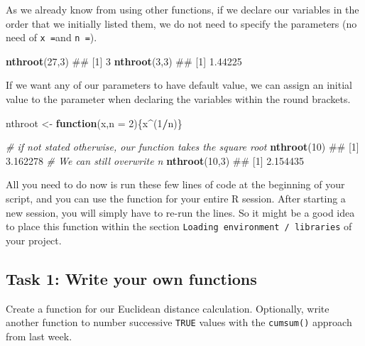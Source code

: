 \documentclass[]{book}
\newenvironment{Shaded}{\begin{snugshade}}{\end{snugshade}}
\newcommand{\KeywordTok}[1]{\textcolor[rgb]{0.13,0.29,0.53}{\textbf{#1}}}
\newcommand{\DataTypeTok}[1]{\textcolor[rgb]{0.13,0.29,0.53}{#1}}
\newcommand{\DecValTok}[1]{\textcolor[rgb]{0.00,0.00,0.81}{#1}}
\newcommand{\StringTok}[1]{\textcolor[rgb]{0.31,0.60,0.02}{#1}}
\newcommand{\CommentTok}[1]{\textcolor[rgb]{0.56,0.35,0.01}{\textit{#1}}}
\newcommand{\ControlFlowTok}[1]{\textcolor[rgb]{0.13,0.29,0.53}{\textbf{#1}}}
\newcommand{\OperatorTok}[1]{\textcolor[rgb]{0.81,0.36,0.00}{\textbf{#1}}}
\newcommand{\NormalTok}[1]{#1}
\begin{document}
As we already know from using other functions, if we declare our
variables in the order that we initially listed them, we do not need to
specify the parameters (no need of \texttt{x\ =}and \texttt{n\ =}).

\begin{Shaded}
\begin{Highlighting}[]
\KeywordTok{nthroot}\NormalTok{(}\DecValTok{27}\NormalTok{,}\DecValTok{3}\NormalTok{)}
\NormalTok{## [1] 3}
\KeywordTok{nthroot}\NormalTok{(}\DecValTok{3}\NormalTok{,}\DecValTok{3}\NormalTok{)}
\NormalTok{## [1] 1.44225}
\end{Highlighting}
\end{Shaded}

If we want any of our parameters to have default value, we can assign an
initial value to the parameter when declaring the variables within the
round brackets.

\begin{Shaded}
\begin{Highlighting}[]
\NormalTok{nthroot <-}\StringTok{ }\ControlFlowTok{function}\NormalTok{(x,}\DataTypeTok{n =} \DecValTok{2}\NormalTok{)\{x}\OperatorTok{^}\NormalTok{(}\DecValTok{1}\OperatorTok{/}\NormalTok{n)\}}

\CommentTok{# if not stated otherwise, our function takes the square root}
\KeywordTok{nthroot}\NormalTok{(}\DecValTok{10}\NormalTok{)}
\NormalTok{## [1] 3.162278}
\CommentTok{# We can still overwrite n}
\KeywordTok{nthroot}\NormalTok{(}\DecValTok{10}\NormalTok{,}\DecValTok{3}\NormalTok{)}
\NormalTok{## [1] 2.154435}
\end{Highlighting}
\end{Shaded}

All you need to do now is run these few lines of code at the beginning
of your script, and you can use the function for your entire R session.
After starting a new session, you will simply have to re-run the lines.
So it might be a good idea to place this function within the section
\texttt{Loading\ environment\ /\ libraries} of your project.

\subsection{Task 1: Write your own
functions}\label{task-1-write-your-own-functions}

Create a function for our Euclidean distance calculation. Optionally,
write another function to number successive \texttt{TRUE} values with
the \texttt{cumsum()} approach from last week.
\end{document}
